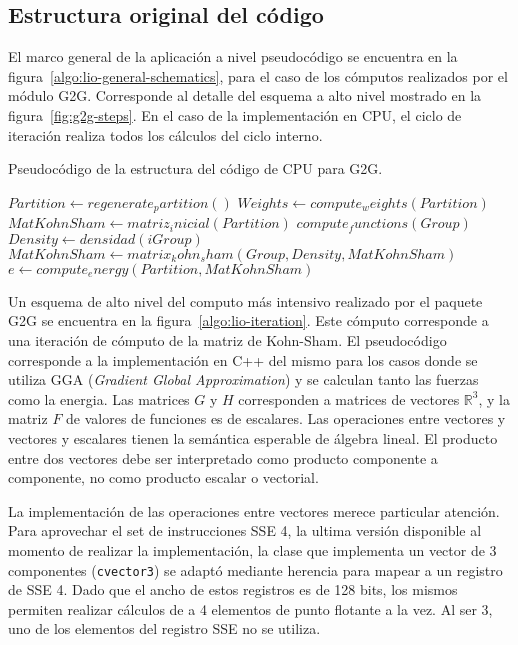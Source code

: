 
\subsection{Estructura original del c\'odigo}

El marco general de la aplicaci\'on a nivel pseudoc\'odigo se encuentra en la
figura~\ref{algo:lio-general-schematics}, para el caso de los c\'omputos realizados
por el m\'odulo G2G. Corresponde al detalle del esquema
a alto nivel mostrado en la figura~\ref{fig:g2g-steps}. En el caso de la
implementaci\'on en CPU, el ciclo de iteraci\'on realiza todos los c\'alculos del
ciclo interno.

\begin{algorithm}[hptb]
    \caption{Pseudoc\'odigo de la estructura del c\'odigo de CPU para G2G.}
    \label{algo:lio-general-schematics}
    \begin{algorithmic}
        \State $Partition \gets regenerate_partition()$
        \State $Weights \gets compute_weights(Partition)$
        \State $MatKohnSham \gets matriz_inicial(Partition)$
                \State $compute_functions(Group)$
                \State $Density \gets densidad(iGroup)$
                \State $MatKohnSham \gets matrix_kohn_sham(Group, Density, MatKohnSham)$
            \EndFor
        \EndWhile
        \State $e \gets compute_energy(Partition, MatKohnSham)$
    \end{algorithmic}
\end{algorithm}

Un esquema de alto nivel del computo m\'as intensivo realizado por el paquete
G2G se encuentra en la figura~\ref{algo:lio-iteration}. Este c\'omputo corresponde
a una iteraci\'on de c\'omputo de la matriz de Kohn-Sham. El pseudoc\'odigo
corresponde a la implementaci\'on en C++ del mismo para los casos donde se
utiliza GGA (\textit{Gradient Global Approximation}) y se calculan tanto las
fuerzas como la energia.
Las matrices $G$ y $H$ corresponden a matrices de vectores $\mathbb{R}^3$, y
la matriz $F$ de valores de funciones es de escalares. Las operaciones entre
vectores y vectores y escalares tienen la sem\'antica esperable de \'algebra
lineal. El producto entre dos vectores debe ser interpretado como producto
componente a componente, no como producto escalar o vectorial.

La implementaci\'on de las operaciones entre vectores merece particular atenci\'on.
Para aprovechar el set de instrucciones SSE 4, la ultima versi\'on disponible al
momento de realizar la implementaci\'on, la clase que implementa un vector de 3
componentes (\texttt{cvector3}) se adapt\'o mediante herencia para mapear a un
registro de SSE 4. Dado que el ancho de estos registros es de 128 bits, los mismos
permiten realizar c\'alculos de a 4 elementos de punto flotante a la vez. Al ser 3, uno de los
elementos del registro SSE no se utiliza.

